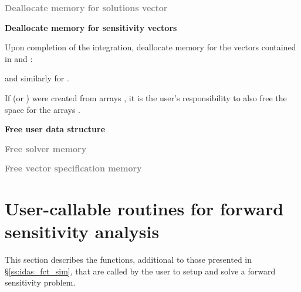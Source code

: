 \begin{Steps}
\item
  \textcolor{gray}{\bf Deallocate memory for solutions vector}

\item 
  {\bf Deallocate memory for sensitivity vectors}

  Upon completion of the integration, deallocate memory for the vectors contained
  in  and :

  {\s} 

  {\p} 

  and similarly for .

  If  (or ) were created from  arrays , it is the
  user's responsibility to also free the space for the arrays .

\item
  {\bf Free user data structure}

\item
  \textcolor{gray}{\bf Free solver memory}
  
\item
  \textcolor{gray}{\bf Free vector specification memory}

\end{Steps}

\section{User-callable routines for forward sensitivity analysis}

This section describes the {\idas} functions, additional to those presented
in \S\ref{ss:idas_fct_sim}, that are called by the user to setup and solve
a forward sensitivity problem.

